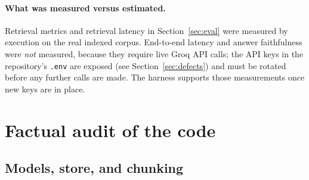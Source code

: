\documentclass[11pt,a4paper]{article}
\begin{document}
\paragraph{What was measured versus estimated.} Retrieval metrics and retrieval
latency in Section~\ref{sec:eval} were measured by execution on the real indexed
corpus. End-to-end latency and answer faithfulness were \emph{not} measured,
because they require live Groq API calls; the API keys in the repository's
\texttt{.env} are exposed (see Section~\ref{sec:defects}) and must be rotated
before any further calls are made. The harness supports those measurements once
new keys are in place.

\section{Factual audit of the code}

\subsection{Models, store, and chunking}
\end{document}
